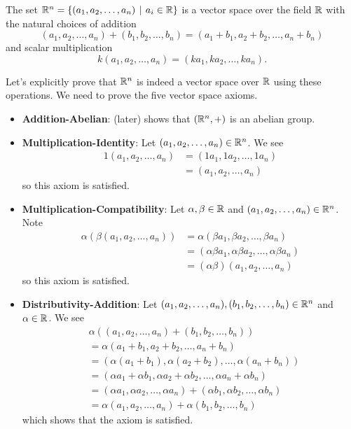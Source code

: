 \begin{example}\label{example-R^n-is-vector-space}
    The set $\R^n = \{(a_1, a_2, \dots, a_n) \vert a_i \in \R\}$ is a vector space over the field $\mathbb{R}$ with the natural choices of addition
    \[
        (a_1, a_2, \dots, a_n) + (b_1, b_2, \dots, b_n) = (a_1 + b_1, a_2 + b_2, \dots, a_n + b_n)
    \]
    and scalar multiplication
    \[
        k(a_1, a_2, \dots, a_n) = (ka_1, ka_2, \dots, ka_n).
    \]

    Let's explicitly prove that $\mathbb{R}^n$ is indeed a vector space over $\mathbb{R}$ using these operations. We need to prove the five vector space axioms.
    \begin{itemize}
        \item \textbf{Addition-Abelian}:  (later) shows that $(\mathbb{R}^n, +)$ is an abelian group.

        \item \textbf{Multiplication-Identity}: Let $(a_1, a_2, \dots, a_n) \in \mathbb{R}^n$. We see
        \begin{align*}
            1(a_1, a_2, \dots, a_n) &= (1a_1, 1a_2, \dots, 1a_n)\\
            &= (a_1, a_2, \dots, a_n)
        \end{align*}
        so this axiom is satisfied.

        \item \textbf{Multiplication-Compatibility}: Let $\alpha, \beta \in \mathbb{R}$ and $(a_1, a_2, \dots, a_n) \in \mathbb{R}^n$. Note
        \begin{align*}
            \alpha\left(\beta(a_1, a_2, \dots, a_n)\right) &= \alpha(\beta a_1, \beta a_2, \dots, \beta a_n)\\
            &= (\alpha\beta a_1, \alpha\beta a_2, \dots, \alpha\beta a_n)\\
            &= (\alpha\beta)(a_1, a_2, \dots, a_n)
        \end{align*}
        so this axiom is satisfied.

        \item \textbf{Distributivity-Addition}: Let $(a_1, a_2, \dots, a_n), (b_1, b_2, \dots, b_n) \in \mathbb{R}^n$ and $\alpha \in \mathbb{R}$. We see
        \begin{align*}
            &\alpha\left((a_1, a_2, \dots, a_n) + (b_1, b_2, \dots, b_n)\right)\\
            &= \alpha(a_1 + b_1, a_2 + b_2, \dots, a_n + b_n)\\
            &= (\alpha(a_1 + b_1), \alpha(a_2 + b_2), \dots, \alpha(a_n + b_n))\\
            &= (\alpha a_1 + \alpha b_1, \alpha a_2 + \alpha b_2, \dots, \alpha a_n + \alpha b_n)\\
            &= (\alpha a_1, \alpha a_2, \dots, \alpha a_n) + (\alpha b_1, \alpha b_2, \dots, \alpha b_n)\\
            &= \alpha(a_1, a_2, \dots, a_n) + \alpha(b_1, b_2, \dots, b_n)
        \end{align*}
        which shows that the axiom is satisfied.


\end{itemize}
\end{example}
